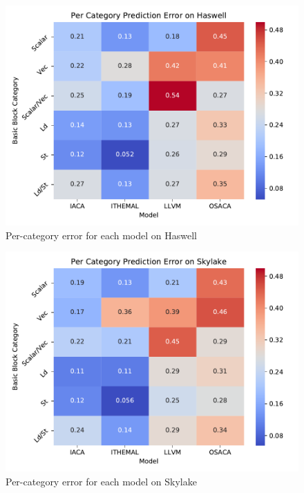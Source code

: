 \begin{figure}
\includegraphics[width=\columnwidth]{figures/hsw-cluster-err.pdf}
\caption{Per-category error for each model on Haswell}
\label{fig:hsw-cluster-err}
\end{figure}

\begin{figure}
\includegraphics[width=\columnwidth]{figures/skl-cluster-err.pdf}
\caption{Per-category error for each model on Skylake}
\label{fig:skl-cluster-err}
\end{figure} 

